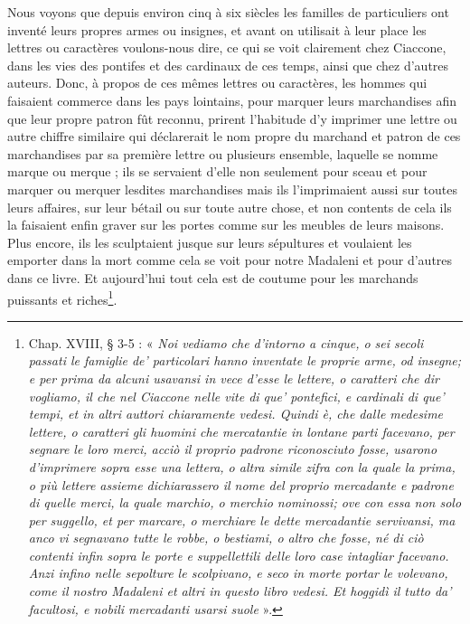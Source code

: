 \documentclass[12pt,twoside,openany]{book}
\renewenvironment{quote}
  {%
    \par\begingroup
    \fontsize{11pt}{14pt}\selectfont
    \list{}{\leftmargin=1.5em\rightmargin=1.5em}%
    \item\relax
  }
  {%
    \endlist
    \endgroup
  }
\newenvironment{PurhBlockQuote}
  {%
    \begin{quote}
  }
  {%
    \end{quote}
  }
\begin{document}
\begin{PurhBlockQuote}
Nous voyons que depuis environ cinq à six siècles les familles de particuliers ont inventé leurs propres armes ou insignes, et avant on utilisait à leur place les lettres ou caractères voulons-nous dire, ce qui se voit clairement chez Ciaccone, dans les vies des pontifes et des cardinaux de ces temps, ainsi que chez d’autres auteurs. Donc, à propos de ces mêmes lettres ou caractères, les hommes qui faisaient commerce dans les pays lointains, pour marquer leurs marchandises afin que leur propre patron fût reconnu, prirent l’habitude d’y imprimer une lettre ou autre chiffre similaire qui déclarerait le nom propre du marchand et patron de ces marchandises par sa première lettre ou plusieurs ensemble, laquelle se nomme marque ou merque ; ils se servaient d’elle non seulement pour sceau et pour marquer ou merquer lesdites marchandises mais ils l’imprimaient aussi sur toutes leurs affaires, sur leur bétail ou sur toute autre chose, et non contents de cela ils la faisaient enfin graver sur les portes comme sur les meubles de leurs maisons. Plus encore, ils les sculptaient jusque sur leurs sépultures et voulaient les emporter dans la mort comme cela se voit pour notre Madaleni et pour d’autres dans ce livre. Et aujourd’hui tout cela est de coutume pour les marchands puissants et riches\footnote{Chap. XVIII, § 3-5 : « \textit{Noi vediamo che d’intorno a cinque, o sei secoli passati le famiglie de’ particolari hanno inventate le proprie arme, od insegne; e per prima da alcuni usavansi in vece d’esse le lettere, o caratteri che dir vogliamo, il che nel Ciaccone nelle vite di que’ pontefici, e cardinali di que’ tempi, et in altri auttori chiaramente vedesi. Quindi è, che dalle medesime lettere, o caratteri gli huomini che mercatantie in lontane parti facevano, per segnare le loro merci, acciò il proprio padrone riconosciuto fosse, usarono d’imprimere sopra esse una lettera, o altra simile zifra con la quale la prima, o più lettere assieme dichiarassero il nome del proprio mercadante e padrone di quelle merci, la quale marchio, o merchio nominossi; ove con essa non solo per suggello, et per marcare, o merchiare le dette mercadantie servivansi, ma anco vi segnavano tutte le robbe, o bestiami, o altro che fosse, né di ciò contenti infin sopra le porte e suppellettili delle loro case intagliar facevano. Anzi infino nelle sepolture le scolpivano, e seco in morte portar le volevano, come il nostro Madaleni et altri in questo libro vedesi. Et hoggidì il tutto da’ facultosi, e nobili mercadanti usarsi suole} ».}.
\end{PurhBlockQuote}
\end{document}
